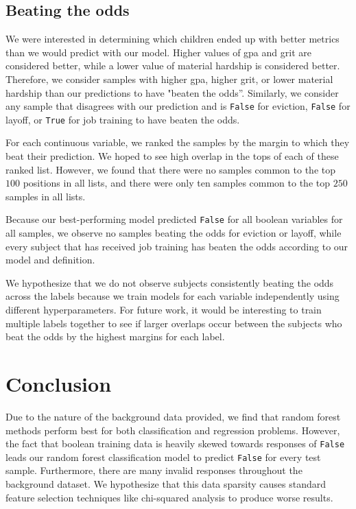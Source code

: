 \documentclass{article} %
\begin{document}
\subsection{Beating the odds}
\label{sec:beatingtheodds}

We were interested in determining which children ended up with better metrics than we would predict with our model. Higher values of gpa and grit are considered better, while a lower value of material hardship is considered better. Therefore, we consider samples with higher gpa, higher grit, or lower material hardship than our predictions to have "beaten the odds''. Similarly, we consider any sample that disagrees with our prediction and is \texttt{False} for eviction, \texttt{False} for layoff, or \texttt{True} for job training to have beaten the odds.

For each continuous variable, we ranked the samples by the margin to which they beat their prediction. We hoped to see high overlap in the tops of each of these ranked list. However, we found that there were no samples common to the top $100$ positions in all lists, and there were only ten samples common to the top $250$ samples in all lists.

Because our best-performing model predicted \texttt{False} for all boolean variables for all samples, we observe no samples beating the odds for eviction or layoff, while every subject that has received job training has beaten the odds according to our model and definition.

We hypothesize that we do not observe subjects consistently beating the odds across the labels because we train models for each variable independently using different hyperparameters. For future work, it would be interesting to train multiple labels together to see if larger overlaps occur between the subjects who beat the odds by the highest margins for each label.

\section{Conclusion}
\label{sec:conclusion}

Due to the nature of the background data provided, we find that random forest methods perform best for both classification and regression problems. However, the fact that boolean training data is heavily skewed towards responses of \texttt{False} leads our random forest classification model to predict \texttt{False} for every test sample. Furthermore, there are many invalid responses throughout the background dataset. We hypothesize that this data sparsity causes standard feature selection techniques like chi-squared analysis to produce worse results.
\end{document}
